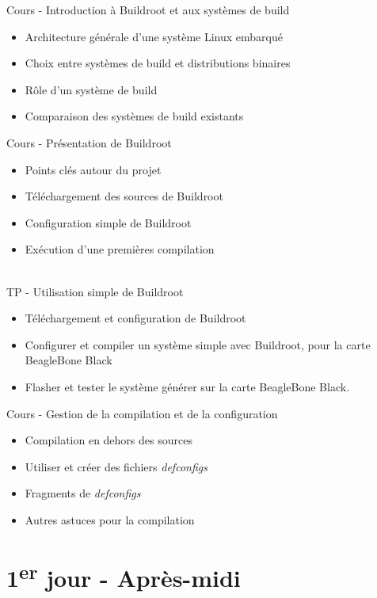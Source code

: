 \documentclass[a4paper,12pt,obeyspaces,spaces,hyphens]{article}
\begin{document}
\feagendatwocolumn
{Cours - Introduction à Buildroot et aux systèmes de build}
{
  \begin{itemize}
  \item Architecture générale d'une système Linux embarqué
  \item Choix entre systèmes de build et distributions binaires
  \item Rôle d'un système de build
  \item Comparaison des systèmes de build existants
  \end{itemize}
}
{Cours - Présentation de Buildroot}
{
  \begin{itemize}
  \item Points clés autour du projet
  \item Téléchargement des sources de Buildroot
  \item Configuration simple de Buildroot
  \item Exécution d'une premières compilation
  \end{itemize}
}
\\
\feagendatwocolumn
{TP - Utilisation simple de Buildroot}
{
  \begin{itemize}
  \item Téléchargement et configuration de Buildroot
  \item Configurer et compiler un système simple avec Buildroot, pour la
        carte BeagleBone Black
  \item Flasher et tester le système générer sur la carte BeagleBone
        Black.
  \end{itemize}
}
{Cours - Gestion de la compilation et de la configuration}
{
  \begin{itemize}
  \item Compilation en dehors des sources
  \item Utiliser et créer des fichiers {\em defconfigs}
  \item Fragments de {\em defconfigs}
  \item Autres astuces pour la compilation
  \end{itemize}
}


\section{1\textsuperscript{er} jour - Après-midi}
\end{document}
